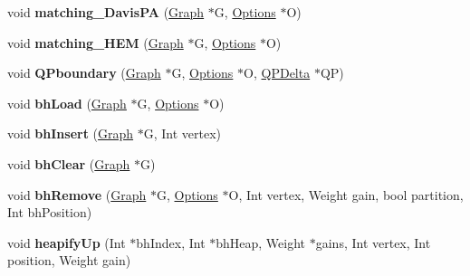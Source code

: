 \begin{DoxyCompactItemize}
\item 
\hypertarget{namespace_mongoose_ac60cd6f25e57c65747eac170b699170c}{}\label{namespace_mongoose_ac60cd6f25e57c65747eac170b699170c} 
void {\bfseries matching\+\_\+\+Davis\+PA} (\hyperlink{class_mongoose_1_1_graph}{Graph} $\ast$G, \hyperlink{struct_mongoose_1_1_options}{Options} $\ast$O)
\item 
\hypertarget{namespace_mongoose_a5a393a8b1557ea4ea1b4bfc703c06c25}{}\label{namespace_mongoose_a5a393a8b1557ea4ea1b4bfc703c06c25} 
void {\bfseries matching\+\_\+\+H\+EM} (\hyperlink{class_mongoose_1_1_graph}{Graph} $\ast$G, \hyperlink{struct_mongoose_1_1_options}{Options} $\ast$O)
\item 
\hypertarget{namespace_mongoose_a8615a1a03d2a7895d15c3b06407dc414}{}\label{namespace_mongoose_a8615a1a03d2a7895d15c3b06407dc414} 
void {\bfseries Q\+Pboundary} (\hyperlink{class_mongoose_1_1_graph}{Graph} $\ast$G, \hyperlink{struct_mongoose_1_1_options}{Options} $\ast$O, \hyperlink{class_mongoose_1_1_q_p_delta}{Q\+P\+Delta} $\ast$QP)
\item 
\hypertarget{namespace_mongoose_a28c8cb486df6e1cf477805f0876aa720}{}\label{namespace_mongoose_a28c8cb486df6e1cf477805f0876aa720} 
void {\bfseries bh\+Load} (\hyperlink{class_mongoose_1_1_graph}{Graph} $\ast$G, \hyperlink{struct_mongoose_1_1_options}{Options} $\ast$O)
\item 
\hypertarget{namespace_mongoose_a5af23d2dc16d30de18bd25382da1a93f}{}\label{namespace_mongoose_a5af23d2dc16d30de18bd25382da1a93f} 
void {\bfseries bh\+Insert} (\hyperlink{class_mongoose_1_1_graph}{Graph} $\ast$G, Int vertex)
\item 
\hypertarget{namespace_mongoose_aeb42424ac8bff101843b2d1a0137575d}{}\label{namespace_mongoose_aeb42424ac8bff101843b2d1a0137575d} 
void {\bfseries bh\+Clear} (\hyperlink{class_mongoose_1_1_graph}{Graph} $\ast$G)
\item 
\hypertarget{namespace_mongoose_ac0c687c0668620e275a62ced7675a951}{}\label{namespace_mongoose_ac0c687c0668620e275a62ced7675a951} 
void {\bfseries bh\+Remove} (\hyperlink{class_mongoose_1_1_graph}{Graph} $\ast$G, \hyperlink{struct_mongoose_1_1_options}{Options} $\ast$O, Int vertex, Weight gain, bool partition, Int bh\+Position)
\item 
\hypertarget{namespace_mongoose_a1dc534ca6d5f0e47ec6941fa47f1f124}{}\label{namespace_mongoose_a1dc534ca6d5f0e47ec6941fa47f1f124} 
void {\bfseries heapify\+Up} (Int $\ast$bh\+Index, Int $\ast$bh\+Heap, Weight $\ast$gains, Int vertex, Int position, Weight gain)
\item 

\end{DoxyCompactItemize}
